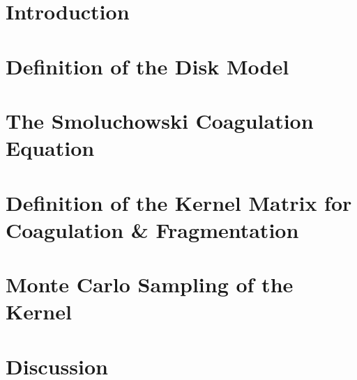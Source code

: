 \documentclass[12 pt]{report}
\begin{document}
    
    \chapter{Introduction}
        
    \chapter{Definition of the Disk Model}
        
    \chapter{The Smoluchowski Coagulation Equation}
        
    \chapter{Definition of the Kernel Matrix for Coagulation \& Fragmentation}
        
    \chapter{Monte Carlo Sampling of the Kernel}
        
    \chapter{Discussion}
        
    
\end{document}

